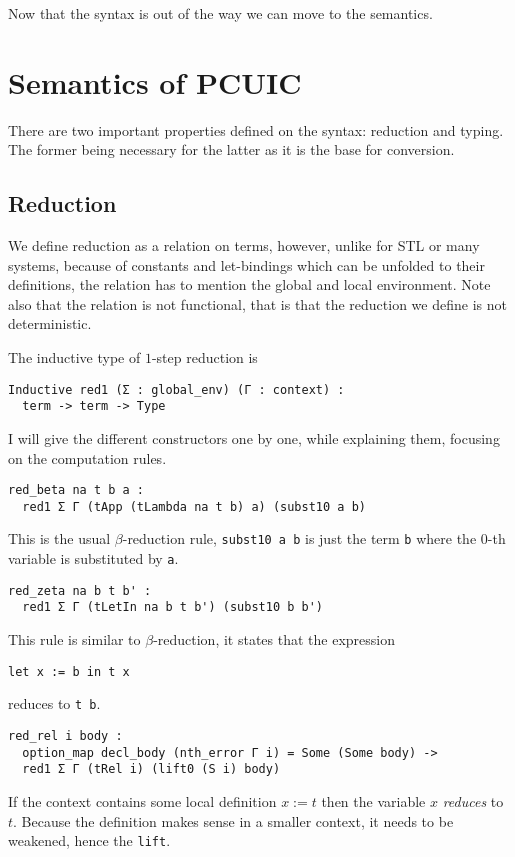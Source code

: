 Now that the syntax is out of the way we can move to the semantics.

\section{Semantics of \acrshort{PCUIC}}

There are two important properties defined on the syntax: reduction and typing.
The former being necessary for the latter as it is the base for conversion.

\subsection{Reduction}

We define reduction as a relation on terms, however, unlike for \acrshort{STL}
or many systems, because of constants and let-bindings which can be unfolded
to their definitions, the relation has to mention the global and local
environment. Note also that the relation is not functional, that is that the
reduction we define is not deterministic.

The inductive type of \(1\)-step reduction is
\begin{verbatim}
Inductive red1 (Σ : global_env) (Γ : context) :
  term -> term -> Type
\end{verbatim}
I will give the different constructors one by one, while explaining them,
focusing on the computation rules.

\begin{verbatim}
red_beta na t b a :
  red1 Σ Γ (tApp (tLambda na t b) a) (subst10 a b)
\end{verbatim}
This is the usual \(\beta\)-reduction rule, \texttt{subst10 a b}
is just the term \texttt{b} where the \(0\)-th variable is substituted
by \texttt{a}.

\begin{verbatim}
red_zeta na b t b' :
  red1 Σ Γ (tLetIn na b t b') (subst10 b b')
\end{verbatim}
This rule is similar to \(\beta\)-reduction, it states that the expression
\begin{verbatim}
let x := b in t x
\end{verbatim}
reduces to \texttt{t b}.

\begin{verbatim}
red_rel i body :
  option_map decl_body (nth_error Γ i) = Some (Some body) ->
  red1 Σ Γ (tRel i) (lift0 (S i) body)
\end{verbatim}
If the context contains some local definition \(x := t\) then the variable
\(x\) \emph{reduces} to \(t\). Because the definition makes sense in a
smaller context, it needs to be weakened, hence the \texttt{lift}.

